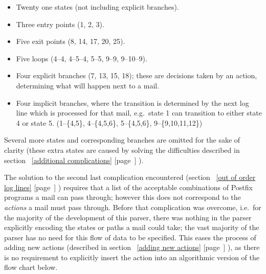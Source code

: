 \documentclass[a4paper,12pt,draft]{article}
\newcommand{\refwithpage}[1]{%
    \empty{}\ref{#1} [page~\pageref{#1}]%
}
\begin{document}
\begin{itemize}

    \item Twenty one states (not including explicit branches).

    \item Three entry points (1, 2, 3).

    \item Five exit points (8, 14, 17, 20, 25).

    \item Five loops (4--4, 4--5--4, 5--5, 9--9, 9--10--9).

    \item Four explicit branches (7, 13, 15, 18); these are decisions taken
        by an action, determining what will happen next to a mail.

    \item Four implicit branches, where the transition is determined by the
        next log line which is processed for that mail, e.g.\ state 1 can
        transition to either state 4 or state 5.  (1--\{4,5\},
        4--\{4,5,6\}, 5--\{4,5,6\}, 9--\{9,10,11,12\})

\end{itemize}

    Several
more states and corresponding branches are omitted for the sake of clarity
(these extra states are caused by solving the difficulties described in
section~\refwithpage{additional complications}).

The solution to the second last complication encountered
(section~\refwithpage{out of order log lines}) requires that a list of the
acceptable combinations of Postfix programs a mail can pass through;
however this does not correspond to the \textit{actions\/} a mail must pass
through.  Before that complication was overcome, i.e.\ for the majority of
the development of this parser, there was nothing in the parser explicitly
encoding the states or paths a mail could take; the vast majority of the
parser has no need for this flow of data to be specified.  This eases the
process of adding new actions (described in section~\refwithpage{adding new
actions}), as there is no requirement to explicitly insert the action into
an algorithmic version of the flow chart below.

\end{document}

